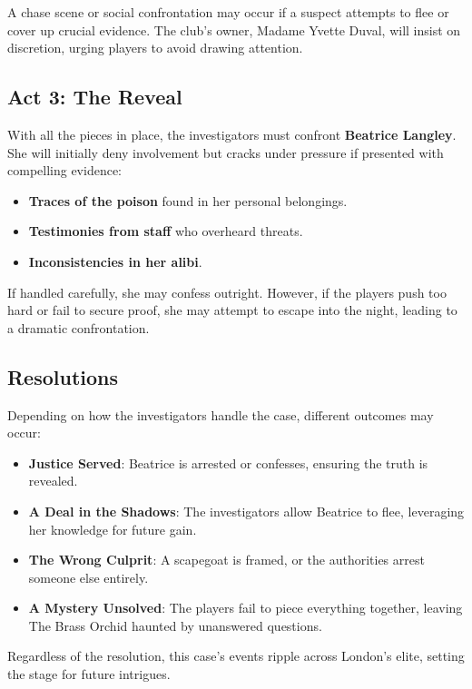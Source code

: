 \noindent
A chase scene or social confrontation may occur if a suspect attempts to flee or cover up crucial evidence. The club’s owner, Madame Yvette Duval, will insist on discretion, urging players to avoid drawing attention.

\subsection{Act 3: The Reveal} 
With all the pieces in place, the investigators must confront \textbf{Beatrice Langley}. She will initially deny involvement but cracks under pressure if presented with compelling evidence:
\begin{DndReadAloud}{}
	\begin{itemize}
		\item \textbf{Traces of the poison} found in her personal belongings.
		\item \textbf{Testimonies from staff} who overheard threats.
		\item \textbf{Inconsistencies in her alibi}.
	\end{itemize}
\end{DndReadAloud}

\noindent
If handled carefully, she may confess outright. However, if the players push too hard or fail to secure proof, she may attempt to escape into the night, leading to a dramatic confrontation.

\subsection{Resolutions} 
Depending on how the investigators handle the case, different outcomes may occur:
\begin{itemize}
	\item \textbf{Justice Served}: Beatrice is arrested or confesses, ensuring the truth is revealed.
	\item \textbf{A Deal in the Shadows}: The investigators allow Beatrice to flee, leveraging her knowledge for future gain.
	\item \textbf{The Wrong Culprit}: A scapegoat is framed, or the authorities arrest someone else entirely.
	\item \textbf{A Mystery Unsolved}: The players fail to piece everything together, leaving The Brass Orchid haunted by unanswered questions.
\end{itemize}

Regardless of the resolution, this case's events ripple across London’s elite, setting the stage for future intrigues.
